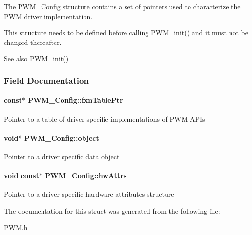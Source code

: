 The \hyperlink{struct_p_w_m___config}{P\+W\+M\+\_\+\+Config} structure contains a set of pointers used to characterize the P\+W\+M driver implementation.

This structure needs to be defined before calling \hyperlink{_p_w_m_8h_aadae3fe77e36cbf9643a22eeb99fb01e}{P\+W\+M\+\_\+init()} and it must not be changed thereafter.

\begin{DoxySeeAlso}{See also}
\hyperlink{_p_w_m_8h_aadae3fe77e36cbf9643a22eeb99fb01e}{P\+W\+M\+\_\+init()} 
\end{DoxySeeAlso}


\subsubsection{Field Documentation}
\paragraph[{fxn\+Table\+Ptr}]{ const$\ast$ P\+W\+M\+\_\+\+Config\+::fxn\+Table\+Ptr}\label{struct_p_w_m___config_ac02604d8e0fafc8b5ff71171a4bf3461}
Pointer to a table of driver-\/specific implementations of P\+W\+M A\+P\+Is 
\paragraph[{object}]{\setlength{\rightskip}{0pt plus 5cm}void$\ast$ P\+W\+M\+\_\+\+Config\+::object}\label{struct_p_w_m___config_a33c57f0fe6b8af13f7a9c8ec392019a6}
Pointer to a driver specific data object 
\paragraph[{hw\+Attrs}]{\setlength{\rightskip}{0pt plus 5cm}void const$\ast$ P\+W\+M\+\_\+\+Config\+::hw\+Attrs}\label{struct_p_w_m___config_a2299aba19683340f917ca962a9536148}
Pointer to a driver specific hardware attributes structure 

The documentation for this struct was generated from the following file\+:\begin{DoxyCompactItemize}
\item 
\hyperlink{_p_w_m_8h}{P\+W\+M.\+h}\end{DoxyCompactItemize}
